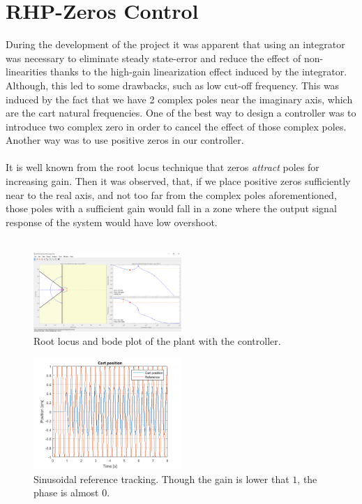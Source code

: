 \section{RHP-Zeros Control}
During the development of the project it was apparent that using an integrator was necessary to eliminate steady state-error and reduce the effect of non-linearities thanks to the high-gain linearization effect induced by the integrator. Although, this led to some drawbacks, such as low cut-off frequency. This was induced by the fact that we have 2 complex poles near the imaginary axis, which are the cart natural frequencies. One of the best way to design a controller was to introduce two complex zero in order to cancel the effect of those complex poles. Another way was to use positive zeros in our controller.\\ \\
It is well known from the root locus technique that zeros \emph{attract} poles for increasing gain. Then it was observed, that, if we place positive zeros sufficiently near to the real axis, and not too far from the complex poles  aforementioned, those poles with a sufficient gain would fall in a zone where the output signal response of the system would have low overshoot. \\ \\

\begin{figure}[h]
\centering
\includegraphics[width=0.5\textwidth]{img/pos_zeros_design.png}
\caption{Root locus and bode plot of the plant with the controller.}
\end{figure}

\begin{figure}[h]
\centering
\includegraphics[width=0.5\textwidth]{img/pos_zeros_sin.png}
\caption{Sinusoidal reference tracking. Though the gain is lower that $1$, the phase is almost $0$.}
\end{figure}


